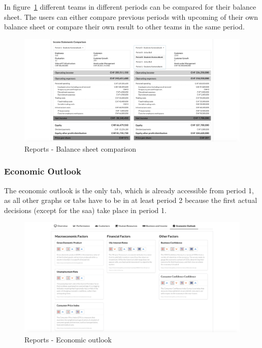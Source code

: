 In figure~\ref{fig:reports_balance_sheet_comparison} different teams in different periods can be compared for their balance sheet. The users can either compare previous periods with upcoming of their own balance sheet or compare their own result to other teams in the same period.
\begin{figure}[h!]
  \centering
  \includegraphics[scale=0.2]{img/application-overview/reports/05_business_income_balance_sheet_comparison.png}
  \caption{Reports - Balance sheet comparison}
  \label{fig:reports_balance_sheet_comparison}
\end{figure}


\subsubsection{Economic Outlook}
The economic outlook is the only tab, which is already accessible from period 1, as all other graphs or tabs have to be in at least period 2 because the first actual decisions (except for the saa) take place in period 1.
\begin{figure}[h!]
  \centering
  \includegraphics[scale=0.2]{img/application-overview/reports/06_economic_outlook.png}
  \caption{Reports - Economic outlook}
\end{figure}
